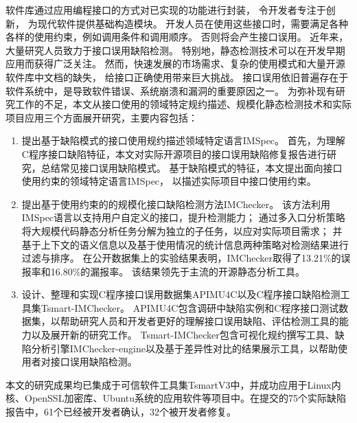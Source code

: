 \begin{cabstract}
  软件库通过应用编程接口的方式对已实现的功能进行封装，
  令开发者专注于创新，
  为现代软件提供基础构造模块。
  开发人员在使用这些接口时，需要满足各种各样的使用约束，例如调用条件和调用顺序。
  否则将会产生接口误用。
  近年来，大量研究人员致力于接口误用缺陷检测。
  特别地，静态检测技术可以在开发早期应用而获得广泛关注。
  然而，快速发展的市场需求、复杂的使用模式和大量开源软件库中文档的缺失，
  给接口正确使用带来巨大挑战。
  接口误用依旧普遍存在于软件系统中，是导致软件错误、系统崩溃和漏洞的重要原因之一。
  为弥补现有研究工作的不足，本文从接口使用的领域特定规约描述、规模化静态检测技术和实际项目应用三个方面展开研究，主要内容包括：
  \begin{enumerate}
  	\item 提出基于缺陷模式的接口使用规约描述领域特定语言IMSpec。
  	首先，为理解C程序接口缺陷特征，本文对实际开源项目的接口误用缺陷修复报告进行研究，总结常见接口误用缺陷模式。
  	基于缺陷模式的特征，本文提出面向接口使用约束的领域特定语言IMSpec，
  	以描述实际项目中接口使用约束。
  	\item 提出基于使用约束的的规模化接口缺陷检测方法IMChecker。
  	该方法利用IMSpec语言以支持用户自定义的接口，提升检测能力；
  	通过多入口分析策略将大规模代码静态分析任务分解为独立的子任务，以应对实际项目需求；
  	并基于上下文的语义信息以及基于使用情况的统计信息两种策略对检测结果进行过滤与排序。
  	在公开数据集上的实验结果表明，IMChecker取得了13.21\%的误报率和16.80\%的漏报率。
  	该结果领先于主流的开源静态分析工具。
  	\item 设计、整理和实现C程序接口误用数据集APIMU4C以及C程序接口缺陷检测工具集Tsmart-IMChecker。
  	APIMU4C包含调研中缺陷实例和C程序接口测试数据集，以帮助研究人员和开发者更好的理解接口误用缺陷、评估检测工具的能力以及展开新的研究工作。
  	Tsmart-IMChecker包含可视化规约撰写工具、缺陷分析引擎IMChecker-engine以及基于差异性对比的结果展示工具，以帮助使用者对接口误用缺陷检测。
  \end{enumerate}
  
  本文的研究成果均已集成于可信软件工具集TsmartV3中，并成功应用于Linux内核、OpenSSL加密库、Ubuntu系统的应用软件等项目中。在提交的75个实际缺陷报告中，61个已经被开发者确认，32个被开发者修复。
  
\end{cabstract}


